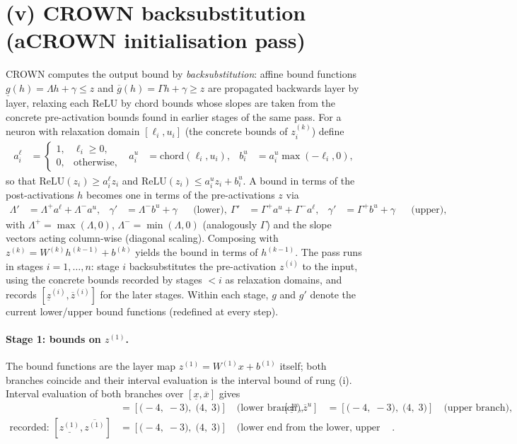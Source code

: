 \documentclass[11pt]{article}
\begin{document}
\section{(v) CROWN backsubstitution (aCROWN initialisation pass)}
CROWN computes the output bound by \emph{backsubstitution}: affine bound functions
$\underline{g}(h) = \Lambda h + \gamma \le z$ and $\overline{g}(h) = \Gamma h + \gamma \ge z$
are propagated backwards layer by layer, relaxing each ReLU by chord bounds whose slopes are taken
from the concrete pre-activation bounds found in earlier stages of the same pass. For a neuron with
relaxation domain $[\ell_i, u_i]$ (the concrete bounds of $z^{(k)}_i$) define
\begin{align*}
a^{\ell}_i &= \begin{cases} 1, & \ell_i \ge 0,\\ 0, & \text{otherwise}, \end{cases} & a^{u}_i &= \mathrm{chord}(\ell_i, u_i), & b^{u}_i &= a^{u}_i \max(-\ell_i, 0),
\end{align*}
so that $\mathrm{ReLU}(z_i) \ge a^{\ell}_i z_i$ and
$\mathrm{ReLU}(z_i) \le a^{u}_i z_i + b^{u}_i$. A bound in terms of the post-activations $h$ becomes
one in terms of the pre-activations $z$ via
\begin{align*}
\Lambda' &= \Lambda^{+} a^{\ell} + \Lambda^{-} a^{u}, & \gamma' &= \Lambda^{-} b^{u} + \gamma && \text{(lower)}, \
\Gamma' &= \Gamma^{+} a^{u} + \Gamma^{-} a^{\ell}, & \gamma' &= \Gamma^{+} b^{u} + \gamma && \text{(upper)},
\end{align*}
with $\Lambda^{+} = \max(\Lambda, 0)$, $\Lambda^{-} = \min(\Lambda, 0)$ (analogously $\Gamma$) and the
slope vectors acting column-wise (diagonal scaling). Composing with
$z^{(k)} = W^{(k)} h^{(k-1)} + b^{(k)}$ yields the bound in terms of $h^{(k-1)}$. The pass runs in
stages $i = 1, \dots, n$: stage $i$ backsubstitutes the pre-activation $z^{(i)}$ to the input, using
the concrete bounds recorded by stages $< i$ as relaxation domains, and records
$[\underline{z}^{(i)}, \overline{z}^{(i)}]$ for the later stages. Within each stage, $g$ and $g'$
denote the current lower/upper bound functions (redefined at every step).
\paragraph{Stage 1: bounds on $z^{(1)}$.}
The bound functions are the layer map $z^{(1)} = W^{(1)} x + b^{(1)}$ itself; both branches coincide and their interval evaluation is the interval bound of rung (i).
Interval evaluation of both branches over $[\underline{x}, \overline{x}]$ gives
\begin{align*}
[\underline{z}^{\ell}, \overline{z}^{\ell}] &= [\bigl(-4,\; -3\bigr),\; \bigl(4,\; 3\bigr)] \quad\text{(lower branch)}, & [\underline{z}^{u}, \overline{z}^{u}] &= [\bigl(-4,\; -3\bigr),\; \bigl(4,\; 3\bigr)] \quad\text{(upper branch)}, \\
\text{recorded: } [\underline{z^{(1)}}, \overline{z^{(1)}}] &= [\bigl(-4,\; -3\bigr),\; \bigl(4,\; 3\bigr)] \quad\text{(lower end from the lower, upper end from the upper branch)}.
\end{align*}
\end{document}
